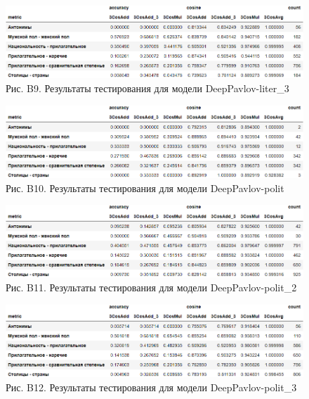 \documentclass[a4paper,14pt]{article}
\begin{document}
\begin{figure}[H]
	\centering
	\includegraphics[width=0.9\linewidth]{image/res_DeepPavlov-liter_3 }
	\caption*{Рис. B9. Результаты тестирования для модели DeepPavlov-liter\_3 }
	\label{fig:resDeepPavlov-liter3 }
\end{figure}

\begin{figure}[H]
	\centering
	\includegraphics[width=0.9\linewidth]{image/res_DeepPavlov-polit }
	\caption*{Рис. B10. Результаты тестирования для модели DeepPavlov-polit }
	\label{fig:resDeepPavlov-polit }
\end{figure}

\begin{figure}[H]
	\centering
	\includegraphics[width=0.9\linewidth]{image/res_DeepPavlov-polit_2 }
	\caption*{Рис. B11. Результаты тестирования для модели DeepPavlov-polit\_2 }
	\label{fig:resDeepPavlov-polit2 }
\end{figure}

\begin{figure}[H]
	\centering
	\includegraphics[width=0.9\linewidth]{image/res_DeepPavlov-polit_3 }
	\caption*{Рис. B12. Результаты тестирования для модели DeepPavlov-polit\_3 }
	\label{fig:resDeepPavlov-polit3 }
\end{figure}
\end{document}
